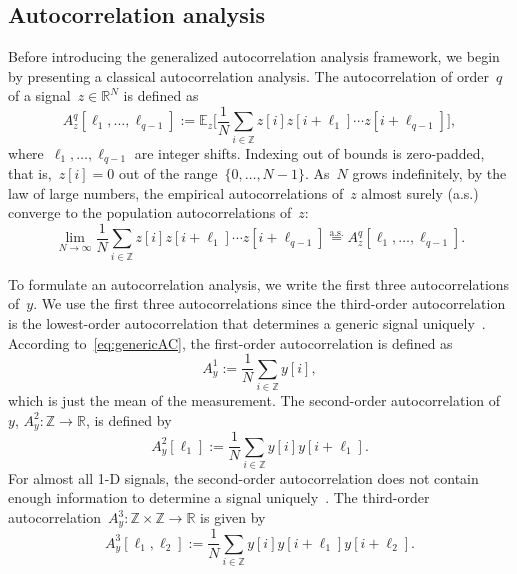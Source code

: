 \documentclass{article}
\begin{document}
\subsection{Autocorrelation analysis}
\label{subsec:ac}
{Before introducing the generalized autocorrelation analysis framework, we begin by presenting a classical autocorrelation analysis}. The autocorrelation of order~$q$ of a signal~\mbox{$z \in \mathbb{R}^{N}$} is defined as
\begin{equation}
A_z^q[\ell_1, \ldots, \ell_{q-1}] := \mathbb{E}_z\Big[\frac{1}{N} \sum_{i \in \mathbb{Z}} z[i] z[i + \ell_1] \cdots z[i + \ell_{q-1}]\Big],
\end{equation}
where~$\ell_1, \ldots, \ell_{q-1}$ are integer shifts. Indexing out of bounds is zero-padded, that is,~\mbox{$z[i] = 0$} out of the range~\mbox{$\{0, \ldots, {N-1}\}$}. As~$N$ grows indefinitely, by the law of large numbers, the empirical autocorrelations of~$z$ almost surely (a.s.) converge to the population autocorrelations of~$z$:
\begin{equation}\label{eq:genericAC}
\lim_{N \rightarrow \infty} \frac{1}{N} \sum_{i \in \mathbb{Z}} z[i] z[i + \ell_1] \cdots z[i + \ell_{q-1}] \stackrel{\text{a.s.}}{=}A_z^q[\ell_1, \ldots, \ell_{q-1}].
\end{equation}

To formulate an autocorrelation analysis, we write the first three autocorrelations of~$y$. {We use the first three autocorrelations since the third-order autocorrelation is the lowest-order autocorrelation that determines a generic signal uniquely~\cite{bendory2019multi}}. According to~\eqref{eq:genericAC}, the first-order autocorrelation is defined as
\begin{equation}
A_{y}^1 := \frac{1}{N} \sum_{i \in \mathbb{Z}} y[i],
\end{equation}
which is just the mean of the measurement. The second-order autocorrelation of~$y$, \mbox{$A_{y}^2: \mathbb{Z} \rightarrow \mathbb{R}$}, is defined by
\begin{equation}
A_{y}^2 [\ell_1] := \frac{1}{N} \sum_{i \in \mathbb{Z}} y[i] y[i + \ell_1].
\end{equation}
{For almost all \mbox{1-D} signals, the second-order autocorrelation does not contain enough information to determine a signal uniquely~\cite{beinert2018enforcing,bendory2017fourier}}. The third-order autocorrelation~\mbox{$A_{y}^3: \mathbb{Z} \times \mathbb{Z} \rightarrow \mathbb{R}$} {is given} by
\begin{equation}
A_{y}^3 [\ell_1, \ell_2] := \frac{1}{N} \sum_{i \in \mathbb{Z}} y[i] y[i + \ell_1] y[i + \ell_2].
\end{equation}
\end{document}
